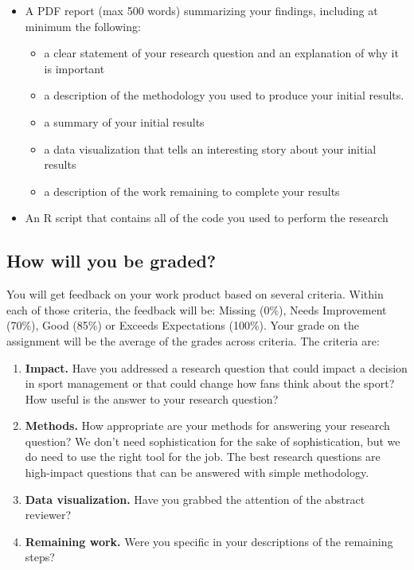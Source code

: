 \documentclass{article}
\begin{document}
        \begin{itemize}
          \item A PDF report (max 500 words) summarizing your findings, including at minimum the following:
          \begin{itemize}
            \item a clear statement of your research question and an explanation of why it is important
            \item a description of the methodology you used to produce your initial results.
            \item a summary of your initial results
            \item a data visualization that tells an interesting story about your initial results
            \item a description of the work remaining to complete your results
          \end{itemize}
          \item An R script that contains all of the code you used to perform the research
        \end{itemize}

    \subsection*{\sc How will you be graded?}

      You will get feedback on your work product based on several criteria. Within each of those criteria, the feedback will be: Missing (0\%), Needs Improvement (70\%), Good (85\%) or Exceeds Expectations (100\%). Your grade on the assignment will be the average of the grades across criteria. The criteria are:
      \begin{enumerate}
        \item {\bf Impact.} Have you addressed a research question that could impact a decision in sport management or that could change how fans think about the sport? How useful is the answer to your research question?
        \item {\bf Methods.} How appropriate are your methods for answering your research question? We don't need sophistication for the sake of sophistication, but we do need to use the right tool for the job. The best research questions are high-impact questions that can be answered with simple methodology.
        \item {\bf Data visualization.} Have you grabbed the attention of the abstract reviewer?
        \item {\bf Remaining work.} Were you specific in your descriptions of the remaining steps?
      \end{enumerate}
  
\end{document}
